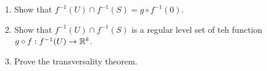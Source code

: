\documentclass[12pt,a4paper]{report}
\newcommand{\BLUE}[1]{\textcolor{blue}{#1}}
\begin{document}
\begin{enumerate}[label=9.\arabic*.]
\begin{enumerate}[label=(\alph*)]

	\item Show that $f^{-1}(U)\cap f^{-1}(S)=g\circ f^{-1}(0)$.
	
	\BLUE{
	}
	
	\item Show that $f^{-1}(U)\cap f^{-1}(S)$ is a regular level set of teh function $g\circ f:f^{-1}(U) \to \mathbb{R}^k$.
	\item Prove the transversality theorem.

\end{enumerate}

\end{enumerate}
\end{document}
